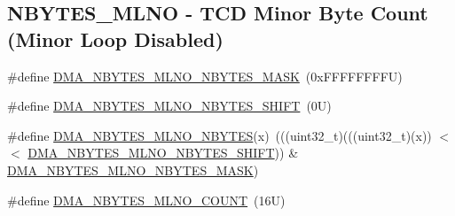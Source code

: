 \subsection*{N\+B\+Y\+T\+E\+S\+\_\+\+M\+L\+NO -\/ T\+CD Minor Byte Count (Minor Loop Disabled)}
\begin{DoxyCompactItemize}
\item 
\#define \mbox{\hyperlink{group___d_m_a___register___masks_ga5898074fa37efdc15af6621cd8daa450}{D\+M\+A\+\_\+\+N\+B\+Y\+T\+E\+S\+\_\+\+M\+L\+N\+O\+\_\+\+N\+B\+Y\+T\+E\+S\+\_\+\+M\+A\+SK}}~(0x\+F\+F\+F\+F\+F\+F\+F\+F\+U)
\item 
\#define \mbox{\hyperlink{group___d_m_a___register___masks_ga98cb66e15329c07a5b38d3d10c0d3dbe}{D\+M\+A\+\_\+\+N\+B\+Y\+T\+E\+S\+\_\+\+M\+L\+N\+O\+\_\+\+N\+B\+Y\+T\+E\+S\+\_\+\+S\+H\+I\+FT}}~(0\+U)
\item 
\#define \mbox{\hyperlink{group___d_m_a___register___masks_ga955150e5aaff65cceeb0e2fb0f08d6c6}{D\+M\+A\+\_\+\+N\+B\+Y\+T\+E\+S\+\_\+\+M\+L\+N\+O\+\_\+\+N\+B\+Y\+T\+ES}}(x)~(((uint32\+\_\+t)(((uint32\+\_\+t)(x)) $<$$<$ \mbox{\hyperlink{group___d_m_a___register___masks_ga98cb66e15329c07a5b38d3d10c0d3dbe}{D\+M\+A\+\_\+\+N\+B\+Y\+T\+E\+S\+\_\+\+M\+L\+N\+O\+\_\+\+N\+B\+Y\+T\+E\+S\+\_\+\+S\+H\+I\+FT}})) \& \mbox{\hyperlink{group___d_m_a___register___masks_ga5898074fa37efdc15af6621cd8daa450}{D\+M\+A\+\_\+\+N\+B\+Y\+T\+E\+S\+\_\+\+M\+L\+N\+O\+\_\+\+N\+B\+Y\+T\+E\+S\+\_\+\+M\+A\+SK}})
\item 
\#define \mbox{\hyperlink{group___d_m_a___register___masks_gac886f238577cebc50d9ba7314543518b}{D\+M\+A\+\_\+\+N\+B\+Y\+T\+E\+S\+\_\+\+M\+L\+N\+O\+\_\+\+C\+O\+U\+NT}}~(16\+U)
\end{DoxyCompactItemize}
